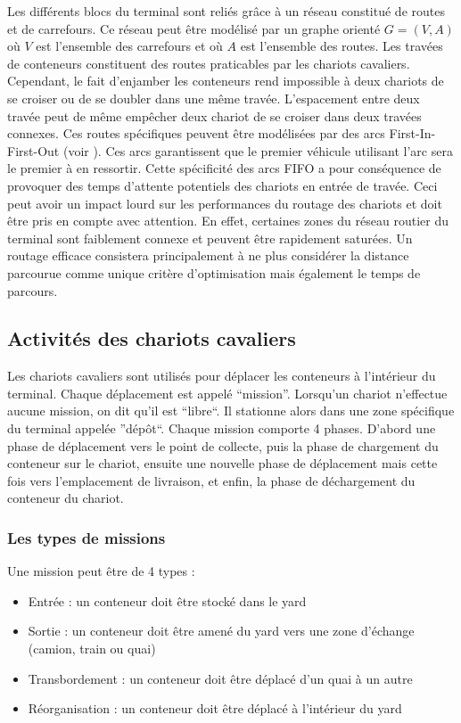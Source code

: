 Les différents blocs du terminal sont reliés grâce à un réseau constitué de routes et de carrefours. Ce réseau peut être modélisé par un graphe orienté $G=(V,A)$ où $V$ est l'ensemble des carrefours et où $A$ est l'ensemble des routes. Les travées de conteneurs constituent des routes praticables par les chariots cavaliers. Cependant, le fait d'enjamber les conteneurs rend impossible à deux chariots de se croiser ou de se doubler dans une même travée. L'espacement entre deux travée peut de même empêcher deux chariot de se croiser dans deux travées connexes. Ces routes spécifiques peuvent être modélisées par des arcs First-In-First-Out (voir \cite{Orda1990}). Ces arcs garantissent que le premier véhicule utilisant l'arc sera le premier à en ressortir.
Cette spécificité des arcs FIFO a pour conséquence de provoquer des temps d'attente potentiels des chariots en entrée de travée. Ceci peut avoir un impact lourd sur les performances du routage des chariots et doit être pris en compte avec attention. En effet, certaines zones du réseau routier du terminal sont faiblement connexe et peuvent être rapidement saturées. Un routage efficace consistera principalement à ne plus considérer la distance parcourue comme unique critère d'optimisation mais également le temps de parcours.

\subsection{Activités des chariots cavaliers}

Les chariots cavaliers sont utilisés pour déplacer les conteneurs à l'intérieur du terminal. Chaque déplacement est appelé ``mission''. Lorsqu'un chariot n'effectue aucune mission, on dit qu'il est ``libre``. Il stationne alors dans une zone spécifique du terminal appelée ''dépôt``. 
Chaque mission comporte 4 phases. D'abord une phase de déplacement vers le point de collecte, puis la phase de chargement du conteneur sur le chariot, ensuite une nouvelle phase de déplacement mais cette fois vers l'emplacement de livraison, et enfin, la phase de déchargement du conteneur du chariot.

\subsubsection{Les types de missions}
Une mission peut être de 4 types :
\begin{itemize}
 \item Entrée : un conteneur doit être stocké dans le yard
 \item Sortie : un conteneur doit être amené du yard vers une zone d'échange (camion, train ou quai)
 \item Transbordement : un conteneur doit être déplacé d'un quai à un autre
 \item Réorganisation : un conteneur doit être déplacé à l'intérieur du yard
\end{itemize}

